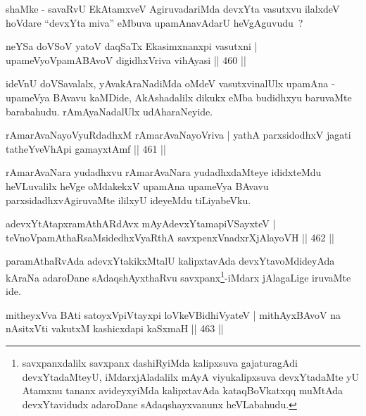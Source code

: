 \begin{artha}
shaMke - savaRvU EkAtamxveV AgiruvadariMda devxYta vasutxvu ilalxdeV hoVdare ``devxYta miva'' eMbuva upamAnavAdarU heVgAguvudu~?
\end{artha}


\begin{shl}
neYSa doVSoV yatoV daqSaTx Ekasimxnanxpi vasutxni |
upameVyoVpamABAvoV digidhxVriva vihAyasi \hfill || 460 ||
\end{shl}

\begin{artha}
ideVnU doVSavalalx, yAvakAraNadiMda oMdeV vasutxvinalUlx upamAna -
upameVya BAvavu kaMDide, AkAshadalilx dikukx eMba budidhxyu baruvaMte
barabahudu. rAmAyaNadalUlx udAharaNeyide.
\end{artha}

\begin{shl}
rAmarAvaNayoVyuRdadhxM rAmarAvaNayoVriva |
yathA parxsidodhxV jagati tatheYveVhApi gamayxtAmf \hfill || 461 ||
\end{shl}

\begin{artha}
rAmarAvaNara yudadhxvu rAmarAvaNara yudadhxdaMteye ididxteMdu
heVLuvalilx heVge oMdakekxV upamAna upameVya BAvavu
parxsidadhxvAgiruvaMte ililxyU ideyeMdu tiLiyabeVku.
\end{artha}



\begin{shl}
adevxYtAtapxramAthARdAvx mAyAdevxYtamapiVSayxteV |
teVnoVpamAthaRsaMsidedhxVyaRthA savxpenxVnadxrXjAlayoVH \hfill || 462 ||
\end{shl}

\begin{artha}
paramAthaRvAda adevxYtakikxMtalU kalipxtavAda devxYtavoMdideyAda
kAraNa adaroDane sAdaqshAyxthaRvu savxpanx\footnote{savxpanxdalilx
 savxpanx dashiRyiMda kalipxsuva gajaturagAdi devxYtadaMteyU,
 iMdarxjAladalilx mAyA viyukalipxsuva devxYtadaMte yU Atamxnu tananx
avideyxyiMda kalipxtavAda kataqBoVkatxqq muMtAda devxYtavidudx
adaroDane sAdaqshayxvanunx heVLabahudu.}-iMdarx jAlagaLige iruvaMte
ide.
\end{artha}


\begin{shl}
mitheyxVva BAti satoyxV\s piVtayxpi loVkeV\s BidhiVyateV |
mithAyxBAvoV na nAsitxVti vakutxM kashicxdapi kaSxmaH \hfill || 463 ||
\end{shl}

